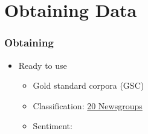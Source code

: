 
\section{Obtaining Data}

\begin{frame}
    \frametitle{Obtaining}
    \begin{itemize}
        \item Ready to use
        \begin{itemize}
            \item Gold standard corpora (GSC)
            \vspace{-5pt}
            \item Classification: \textcolor{iseblue}{\href{http://qwone.com/~jason/20Newsgroups/}{20 Newsgroups}} 
            \hspace*{-2pt}\href{https://archive.ics.uci.edu/ml/datasets/reuters-21578+text+categorization+collection}{}\hspace*{-2pt}
            \href{https://archive.ics.uci.edu/ml/datasets/YouTube+Spam+Collection}{}
            \vspace{-7pt}
            \item Sentiment: \hspace*{-9pt}
            \href{https://snap.stanford.edu/data/web-Amazon.html}{}\hspace*{-3pt}
            \href{http://kavita-ganesan.com/entity-ranking-data}{}\hspace*{-9pt}
        \end{itemize}
        \end{itemize}

\end{frame}

